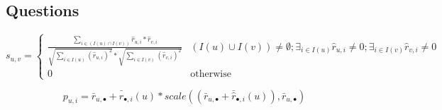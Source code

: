 \documentclass{article}
\begin{document}
\subsection{Questions}
\label{section:q1}

\begin{equation}
    \label{eq:similarity}
    s_{u,v} = \begin{cases}
                   \frac{\sum_{i \in (I(u) \cap I(v))} \hat r_{u,i} * \hat r_{v,i}}
                         { \sqrt{\sum_{i \in I(u)} {(\hat r_{u,i})}^{2}} * \sqrt{\sum_{i \in I(v)} {(\hat r_{v,i})}^{2}}} &
                                    (I(u) \cup I(v)) \neq \emptyset;
                                \exists_{i \in I(u)} \hat r_{u,i} \neq 0; 
                                 \exists_{i \in I(v)} \hat r_{v,i} \neq 0 \\
                         0 & \text{otherwise}
                    \end{cases}
\end{equation}


\begin{equation}
    \label{eq:personalized-prediction}
    p_{u,i} = \bar r_{u,\bullet} + \bar{\hat r}_{\bullet,i}(u) * scale( (\bar r_{u,\bullet} + \bar{\hat r}_{\bullet,i}(u)), \bar r_{u,\bullet})
\end{equation}
\end{document}
